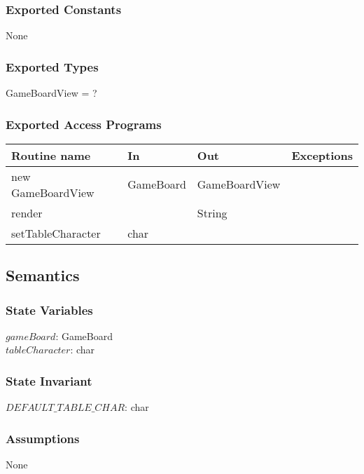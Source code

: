 \documentclass[12pt]{article}
\begin{document}
\subsubsection* {Exported Constants}

None

\subsubsection* {Exported Types}

GameBoardView = ?

\subsubsection* {Exported Access Programs}

\begin{tabular}{| l | l | l | p{5cm} |}
\hline
\textbf{Routine name} & \textbf{In} & \textbf{Out} & \textbf{Exceptions}\\
\hline
new GameBoardView & GameBoard  & GameBoardView & \\
\hline
render & & String & \\
\hline
setTableCharacter & char & & \\
\hline
\end{tabular}

\subsection* {Semantics}

\subsubsection* {State Variables}

$gameBoard$: GameBoard\\
$tableCharacter$: char

\subsubsection* {State Invariant}

$DEFAULT\_TABLE\_CHAR$: char 

\subsubsection* {Assumptions}

None
\end{document}
